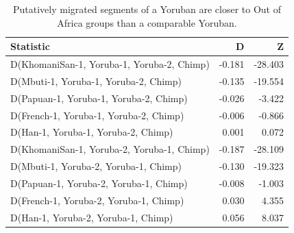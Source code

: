 \documentclass{article}
\begin{document}
\begin{table}[ht]
\centering
\begin{tabular}{lrr}
  \hline
Statistic & D & Z \\ 
  \hline
D(KhomaniSan-1, Yoruba-1, Yoruba-2, Chimp) & -0.181 & -28.403 \\ 
  D(Mbuti-1, Yoruba-1, Yoruba-2, Chimp) & -0.135 & -19.554 \\ 
  D(Papuan-1, Yoruba-1, Yoruba-2, Chimp) & -0.026 & -3.422 \\ 
  D(French-1, Yoruba-1, Yoruba-2, Chimp) & -0.006 & -0.866 \\ 
  D(Han-1, Yoruba-1, Yoruba-2, Chimp) & 0.001 & 0.072 \\ 
  D(KhomaniSan-1, Yoruba-2, Yoruba-1, Chimp) & -0.187 & -28.109 \\ 
  D(Mbuti-1, Yoruba-2, Yoruba-1, Chimp) & -0.130 & -19.323 \\ 
  D(Papuan-1, Yoruba-2, Yoruba-1, Chimp) & -0.008 & -1.003 \\ 
  D(French-1, Yoruba-2, Yoruba-1, Chimp) & 0.030 & 4.355 \\ 
  D(Han-1, Yoruba-2, Yoruba-1, Chimp) & 0.056 & 8.037 \\ 
   \hline
\end{tabular}
\caption{Putatively migrated segments of a Yoruban are closer to Out of Africa groups than a comparable Yoruban.} 
\label{dstats:a1}
\end{table}
\end{document}
